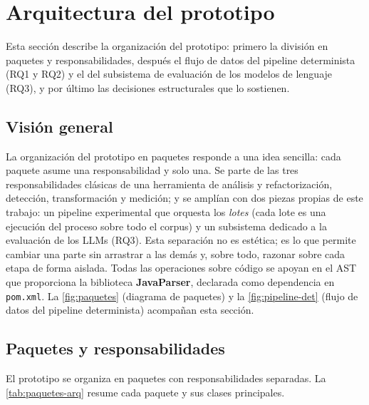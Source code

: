 
\section{Arquitectura del prototipo}
\label{sec:arquitectura}

Esta sección describe la organización del prototipo: primero la división en
paquetes y responsabilidades, después el flujo de datos del pipeline
determinista (RQ1 y RQ2) y el del subsistema de evaluación de los modelos de
lenguaje (RQ3), y por último las decisiones estructurales que lo sostienen.

\subsection{Visión general}
La organización del prototipo en paquetes responde a una idea sencilla:
cada paquete asume una responsabilidad y solo una. Se parte de las tres
responsabilidades clásicas de una herramienta de análisis y
refactorización, detección, transformación y medición; y se amplían
con dos piezas propias de este trabajo: un pipeline experimental que
orquesta los \emph{lotes} (cada lote es una ejecución del proceso sobre todo
el corpus) y un subsistema dedicado a la evaluación de los LLMs
(RQ3). Esta separación no es estética; es lo que permite cambiar una
parte sin arrastrar a las demás y, sobre todo, razonar sobre cada etapa de
forma aislada. Todas las operaciones sobre código se apoyan en el AST que
proporciona la biblioteca \textbf{JavaParser}, declarada como dependencia
en \texttt{pom.xml}. La \autoref{fig:paquetes} (diagrama de paquetes) y la
\autoref{fig:pipeline-det} (flujo de datos del pipeline determinista)
acompañan esta sección.

\subsection{Paquetes y responsabilidades}
El prototipo se organiza en paquetes con responsabilidades separadas. La
\autoref{tab:paquetes-arq} resume cada paquete y sus clases principales.

